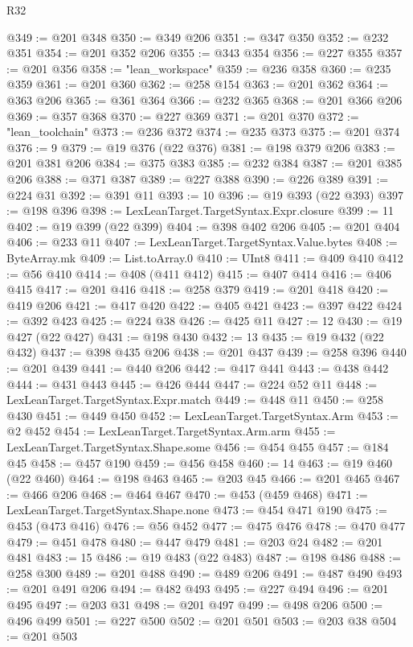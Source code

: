\begin{lexlean}{R32}
\begin{coremodule}
@349 := @201 @348
@350 := @349 @206
@351 := @347 @350
@352 := @232 @351
@354 := @201 @352 @206
@355 := @343 @354
@356 := @227 @355
@357 := @201 @356
@358 := "lean_workspace"
@359 := @236 @358
@360 := @235 @359
@361 := @201 @360
@362 := @258 @154
@363 := @201 @362
@364 := @363 @206
@365 := @361 @364
@366 := @232 @365
@368 := @201 @366 @206
@369 := @357 @368
@370 := @227 @369
@371 := @201 @370
@372 := "lean_toolchain"
@373 := @236 @372
@374 := @235 @373
@375 := @201 @374
@376 := 9
@379 := @19 @376 (@22 @376)
@381 := @198 @379 @206
@383 := @201 @381 @206
@384 := @375 @383
@385 := @232 @384
@387 := @201 @385 @206
@388 := @371 @387
@389 := @227 @388
@390 := @226 @389
@391 := @224 @31
@392 := @391 @11
@393 := 10
@396 := @19 @393 (@22 @393)
@397 := @198 @396
@398 := LexLeanTarget.TargetSyntax.Expr.closure
@399 := 11
@402 := @19 @399 (@22 @399)
@404 := @398 @402 @206
@405 := @201 @404
@406 := @233 @11
@407 := LexLeanTarget.TargetSyntax.Value.bytes
@408 := ByteArray.mk
@409 := List.toArray.{0}
@410 := UInt8
@411 := @409 @410
@412 := @56 @410
@414 := @408 (@411 @412)
@415 := @407 @414
@416 := @406 @415
@417 := @201 @416
@418 := @258 @379
@419 := @201 @418
@420 := @419 @206
@421 := @417 @420
@422 := @405 @421
@423 := @397 @422
@424 := @392 @423
@425 := @224 @38
@426 := @425 @11
@427 := 12
@430 := @19 @427 (@22 @427)
@431 := @198 @430
@432 := 13
@435 := @19 @432 (@22 @432)
@437 := @398 @435 @206
@438 := @201 @437
@439 := @258 @396
@440 := @201 @439
@441 := @440 @206
@442 := @417 @441
@443 := @438 @442
@444 := @431 @443
@445 := @426 @444
@447 := @224 @52 @11
@448 := LexLeanTarget.TargetSyntax.Expr.match
@449 := @448 @11
@450 := @258 @430
@451 := @449 @450
@452 := LexLeanTarget.TargetSyntax.Arm
@453 := @2 @452
@454 := LexLeanTarget.TargetSyntax.Arm.arm
@455 := LexLeanTarget.TargetSyntax.Shape.some
@456 := @454 @455
@457 := @184 @45
@458 := @457 @190
@459 := @456 @458
@460 := 14
@463 := @19 @460 (@22 @460)
@464 := @198 @463
@465 := @203 @45
@466 := @201 @465
@467 := @466 @206
@468 := @464 @467
@470 := @453 (@459 @468)
@471 := LexLeanTarget.TargetSyntax.Shape.none
@473 := @454 @471 @190
@475 := @453 (@473 @416)
@476 := @56 @452
@477 := @475 @476
@478 := @470 @477
@479 := @451 @478
@480 := @447 @479
@481 := @203 @24
@482 := @201 @481
@483 := 15
@486 := @19 @483 (@22 @483)
@487 := @198 @486
@488 := @258 @300
@489 := @201 @488
@490 := @489 @206
@491 := @487 @490
@493 := @201 @491 @206
@494 := @482 @493
@495 := @227 @494
@496 := @201 @495
@497 := @203 @31
@498 := @201 @497
@499 := @498 @206
@500 := @496 @499
@501 := @227 @500
@502 := @201 @501
@503 := @203 @38
@504 := @201 @503

\end{coremodule}
\end{lexlean}
